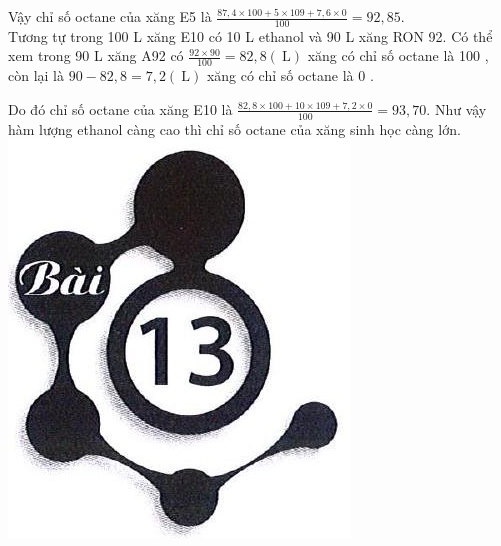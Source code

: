 \documentclass[10pt]{article}
\begin{document}
Vậy chỉ số octane của xăng E5 là $\frac{87,4 \times 100+5 \times 109+7,6 \times 0}{100}=92,85$.\\
Tương tự trong 100 L xăng E10 có 10 L ethanol và 90 L xăng RON 92. Có thể xem trong 90 L xăng A92 có $\frac{92 \times 90}{100}=82,8(\mathrm{~L})$ xăng có chỉ số octane là 100 , còn lại là $90-82,8=7,2(\mathrm{~L})$ xăng có chỉ số octane là 0 .

Do đó chỉ số octane của xăng E10 là $\frac{82,8 \times 100+10 \times 109+7,2 \times 0}{100}=93,70$. Như vậy hàm lượng ethanol càng cao thì chỉ số octane của xăng sinh học càng lớn.\\
\includegraphics[max width=\textwidth, center]{2025_10_23_adad5b98d65ac6665838g-21}
\end{document}
